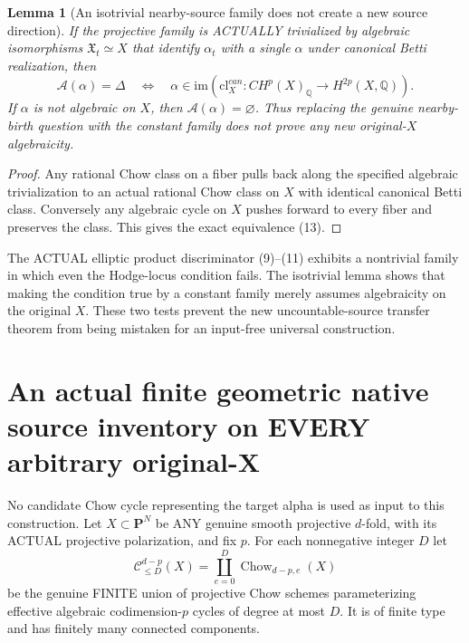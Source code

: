 \documentclass[11pt]{article}
\newcommand{\Q}{\mathbb Q}
\newcommand{\cl}{\mathrm{cl}}
\newcommand{\im}{\mathrm{im}}
\newtheorem{lemma}[theorem]{Lemma}
\begin{document}
\begin{lemma}[An isotrivial nearby-source family does not create a new source direction]
If the
projective
family is
ACTUALLY
trivialized
by algebraic
isomorphisms
\(\mathfrak X_t\simeq X\)
that identify
\(\alpha_t\)
with a single
\(\alpha\)
under canonical
Betti realization,
then
\[
 \boxed{
 \mathscr A(\alpha)=\Delta
 \quad\Longleftrightarrow\quad
 \alpha\in\im(
     \cl_X^{can}:CH^p(X)_\Q\to H^{2p}(X,\Q)).
 }                                                       \tag{13}
\]
If \(\alpha\)
is not
algebraic
on \(X\),
then
\(\mathscr A(\alpha)=\varnothing\).
Thus replacing
the genuine
nearby-birth
question
with the
constant
family
does not
prove any
new
original-\(X\)
algebraicity.
\end{lemma}
\begin{proof}
Any rational
Chow class
on a fiber
pulls back
along the
specified
algebraic
trivialization
to an
actual rational
Chow class
on \(X\)
with
identical
canonical
Betti class.
Conversely
any algebraic
cycle on \(X\)
pushes
forward
to every
fiber and
preserves the
class.
This gives
the exact
equivalence
(13).
\end{proof}

The ACTUAL
elliptic
product
discriminator
(9)--(11)
exhibits
a nontrivial
family in
which even
the Hodge-locus
condition
fails.
The
isotrivial
lemma shows
that making
the condition
true by a
constant
family
merely
assumes
algebraicity
on the
original
\(X\).
These two
tests
prevent
the new
uncountable-source
transfer
theorem
from being
mistaken
for an
input-free
universal
construction.

\section{An actual finite geometric native source inventory on EVERY arbitrary original-X}
No candidate Chow
cycle representing
the target alpha
is used as input
to this construction.
Let \(X\subset\mathbf P^N\)
be ANY genuine
smooth projective
\(d\)-fold, with
its ACTUAL
projective
polarization,
and fix \(p\).
For each nonnegative
integer \(D\)
let
\[
 \mathcal C_{\le D}^{d-p}(X)
 =\coprod_{e=0}^{D}
    \operatorname{Chow}_{d-p,e}(X)
\]
be the genuine
FINITE union
of projective
Chow schemes
parameterizing
effective algebraic
codimension-\(p\)
cycles of degree
at most \(D\).
It is of finite
type and has
finitely many
connected components.
\end{document}
